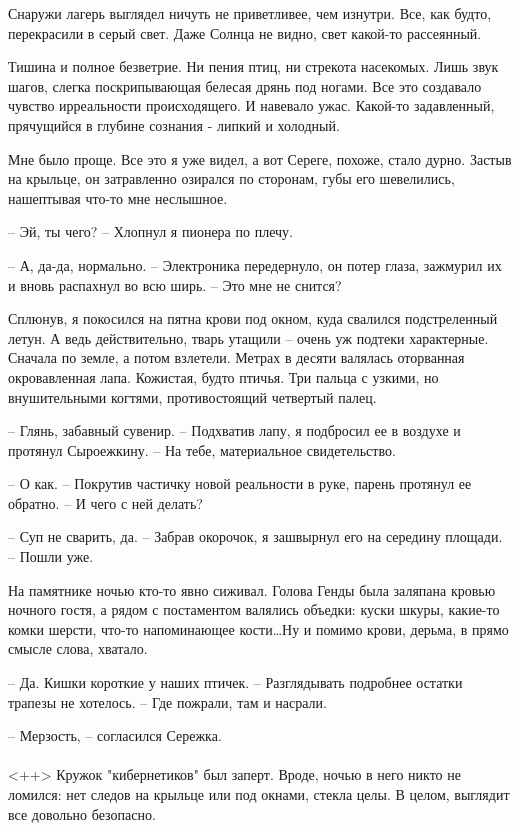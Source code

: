 \documentclass[a4paper]{book}
\begin{document}
Снаружи лагерь выглядел ничуть не приветливее, чем изнутри. Все, как будто, перекрасили в серый свет. Даже Солнца не видно, свет какой-то рассеянный. 

Тишина и полное безветрие. Ни пения птиц, ни стрекота насекомых. Лишь звук шагов, слегка поскрипывающая белесая дрянь под ногами. Все это создавало чувство ирреальности происходящего. И навевало ужас. Какой-то задавленный, прячущийся в глубине сознания - липкий и холодный. 

Мне было проще. Все это я уже видел, а вот Сереге, похоже, стало дурно. Застыв на крыльце, он затравленно озирался по сторонам, губы его шевелились, нашептывая что-то мне неслышное.

-- Эй, ты чего? -- Хлопнул я пионера по плечу.

-- А, да-да, нормально. -- Электроника передернуло, он потер глаза, зажмурил их и вновь распахнул во всю ширь. -- Это мне не снится?

Сплюнув, я покосился на пятна крови под окном, куда свалился подстреленный летун. А ведь действительно, тварь утащили -- очень уж подтеки характерные. Сначала по земле, а потом взлетели. Метрах в десяти валялась оторванная окровавленная лапа. Кожистая, будто птичья. Три пальца с узкими, но внушительными когтями, противостоящий четвертый палец.

-- Глянь, забавный сувенир. -- Подхватив лапу, я подбросил ее в воздухе и протянул Сыроежкину. -- На тебе, материальное свидетельство. 

-- О как. -- Покрутив частичку новой реальности в руке, парень протянул ее обратно. -- И чего с ней делать?

-- Суп не сварить, да. -- Забрав окорочок, я зашвырнул его на середину площади. -- Пошли уже. 

На памятнике ночью кто-то явно сиживал. Голова Генды была заляпана кровью ночного гостя, а рядом с постаментом валялись объедки: куски шкуры, какие-то комки шерсти, что-то напоминающее кости\ldots Ну и помимо крови, дерьма, в прямо смысле слова, хватало.

-- Да. Кишки короткие у наших птичек. -- Разглядывать подробнее остатки трапезы не хотелось. -- Где пожрали, там и насрали.

-- Мерзость, -- согласился Сережка.

\paragraph{}<++>
Кружок "кибернетиков" был заперт. Вроде, ночью в него никто не ломился: нет следов на крыльце или под окнами, стекла целы. В целом, выглядит все довольно безопасно. 
\end{document}
